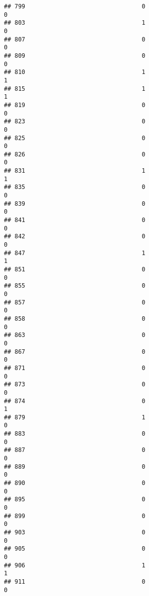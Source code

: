 \documentclass[
]{article}
\begin{document}
\begin{verbatim}
## 799                                 0                                0
## 803                                 1                                0
## 807                                 0                                0
## 809                                 0                                0
## 810                                 1                                1
## 815                                 1                                1
## 819                                 0                                0
## 823                                 0                                0
## 825                                 0                                0
## 826                                 0                                0
## 831                                 1                                1
## 835                                 0                                0
## 839                                 0                                0
## 841                                 0                                0
## 842                                 0                                0
## 847                                 1                                1
## 851                                 0                                0
## 855                                 0                                0
## 857                                 0                                0
## 858                                 0                                0
## 863                                 0                                0
## 867                                 0                                0
## 871                                 0                                0
## 873                                 0                                0
## 874                                 0                                1
## 879                                 1                                0
## 883                                 0                                0
## 887                                 0                                0
## 889                                 0                                0
## 890                                 0                                0
## 895                                 0                                0
## 899                                 0                                0
## 903                                 0                                0
## 905                                 0                                0
## 906                                 1                                1
## 911                                 0                                0

\end{verbatim}
\end{document}
